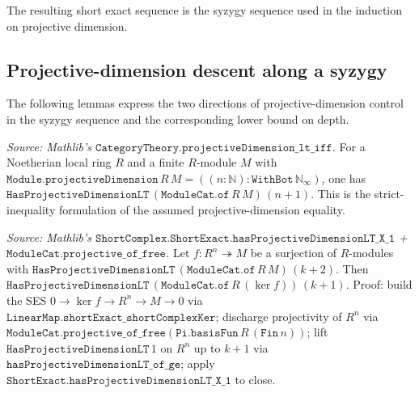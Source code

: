 The resulting short exact sequence is the syzygy sequence used in the
induction on projective dimension.

\subsection{Projective-dimension descent along a syzygy}
\label{mk-subsec:ab_gap1_haspdlt_pivot}

The following lemmas express the two directions of projective-dimension
control in the syzygy sequence and the corresponding lower bound on depth.
\begin{lemma}[Bridge: \(\texttt{projectiveDimension}\,M = n \Rightarrow \texttt{HasProjectiveDimensionLT}\,M\,(n+1)\)]\label{mk-lem:hasProjectiveDimensionLT_succ_of_projectiveDimension_eq}
  \leanok

  \textit{Source: Mathlib's \(\texttt{CategoryTheory.projectiveDimension\_lt\_iff}\).}
  For a Noetherian local ring \(R\) and a finite \(R\)-module \(M\)
  with \(\texttt{Module.projectiveDimension}\,R\,M =
  ((n : \mathbb N) : \texttt{WithBot}\,\mathbb N_\infty)\), one has
  \(\texttt{HasProjectiveDimensionLT}\,(\texttt{ModuleCat.of}\,R\,M)\,
  (n+1)\). This is the strict-inequality formulation of the assumed
  projective-dimension equality.
\end{lemma}
\begin{lemma}\label{mk-lem:hasProjectiveDimensionLT_ker_of_surjection}
  \leanok

  \textit{Source: Mathlib's
  \(\texttt{ShortComplex.ShortExact.hasProjectiveDimensionLT\_X\_1}\) +
  \(\texttt{ModuleCat.projective\_of\_free}\).}
  Let \(f : R^n \twoheadrightarrow M\) be a surjection of \(R\)-modules
  with \(\texttt{HasProjectiveDimensionLT}\,(\texttt{ModuleCat.of}\,R\,M)\,
  (k+2)\). Then
  \(\texttt{HasProjectiveDimensionLT}\,
   (\texttt{ModuleCat.of}\,R\,(\ker f))\,(k+1)\).
  Proof: build the SES \(0 \to \ker f \to R^n \to M \to 0\) via
  \(\texttt{LinearMap.shortExact\_shortComplexKer}\); discharge
  projectivity of \(R^n\) via \(\texttt{ModuleCat.projective\_of\_free}
   (\texttt{Pi.basisFun}\,R\,(\texttt{Fin}\,n))\); lift
  \(\texttt{HasProjectiveDimensionLT}\,1\) on \(R^n\) up to
  \(k+1\) via \(\texttt{hasProjectiveDimensionLT\_of\_ge}\); apply
  \(\texttt{ShortExact.hasProjectiveDimensionLT\_X\_1}\) to close.
\end{lemma}

